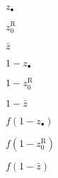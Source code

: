 \documentclass[10pt]{article}
\begin{document}
$z_\bullet$

$z_0^{\mathrm{R}}$

$ \bar{z}$

$1-z_\bullet$

$1-z_0^{\mathrm{R}}$

$1-\bar{z}$

$f(1-z_\bullet)$

$f(1-z_0^{\mathrm{R}})$

$f(1-\bar{z})$
\end{document}
